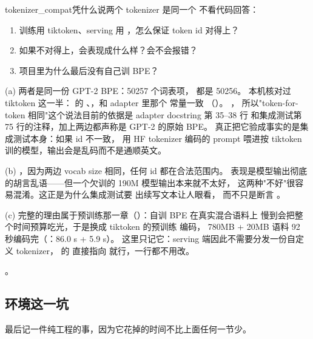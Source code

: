 \begin{checkpoint}{tokenizer_compat}{凭什么说两个 tokenizer 是同一个}
不看代码回答：
\begin{enumerate}[label=(\alph*)]
  \item 训练用 tiktoken、serving 用 ，怎么保证 token id 对得上？
  \item 如果不对得上，会表现成什么样？会不会报错？
  \item 项目里为什么最后没有自己训 BPE？
\end{enumerate}

\ifshowanswers
\tcblower
\answer (a) 两者是同一份 GPT-2 BPE：50257 个词表项， 都是 50256。
本机核对过 tiktoken 这一半： 的
、，和 adapter 里那个
 常量一致
（）。
，
所以"token-for-token 相同"这个说法目前的依据是 adapter docstring 第 35--38 行
和集成测试第 75 行的注释，加上两边都声称是 GPT-2 的原始 BPE。
真正把它验成事实的是集成测试本身：如果 id 不一致，
用 HF tokenizer 编码的 prompt 喂进按 tiktoken 训的模型，输出会是乱码而不是通顺英文。

(b) ，因为两边 vocab size 相同，任何 id 都在合法范围内。
表现是模型输出彻底的胡言乱语——但一个欠训的 190M 模型输出本来就不太好，
这两种"不好"很容易混淆。这正是为什么集成测试要  出续写文本让人眼看，
而不只是断言 。

(c) 完整的理由属于预训练那一章（）：自训 BPE 在真实混合语料上
慢到会把整个时间预算吃光，于是换成 tiktoken 的预训练  编码，
780MB + 20MB 语料 92 秒编码完（：86.0 s + 5.9 s）。
这里只记它：serving 端因此不需要分发一份自定义 tokenizer，
 的  直接指向  就行，一行都不用改。

\whereincode {}。
\fi
\end{checkpoint}

\subsection{环境这一坑}
\label{sec:b-kv-env}

最后记一件纯工程的事，因为它花掉的时间不比上面任何一节少。

